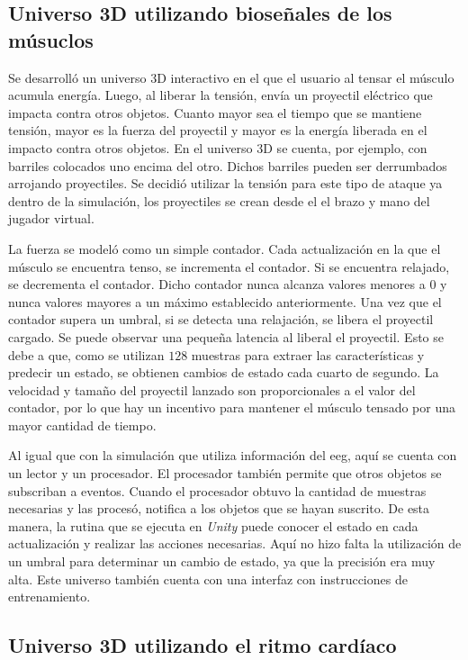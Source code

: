 \subsection{Universo 3D utilizando bioseñales de los músuclos}

Se desarrolló un universo 3D interactivo en el que el usuario al tensar el músculo acumula energía. Luego, al liberar la tensión, envía un proyectil eléctrico que impacta contra otros objetos. Cuanto mayor sea el tiempo que se mantiene tensión, mayor es la fuerza del proyectil y mayor es la energía liberada en el impacto contra otros objetos. En el universo 3D se cuenta, por ejemplo, con barriles colocados uno encima del otro. Dichos barriles pueden ser derrumbados arrojando proyectiles. Se decidió utilizar la tensión para este tipo de ataque ya dentro de la simulación, los proyectiles se crean desde el el brazo y mano del jugador virtual.

La fuerza se modeló como un simple contador. Cada actualización en la que el músculo se encuentra tenso, se incrementa el contador. Si se encuentra relajado, se decrementa el contador. Dicho contador nunca alcanza valores menores a $0$ y nunca valores mayores a un máximo establecido anteriormente. Una vez que el contador supera un umbral, si se detecta una relajación, se libera el proyectil cargado. Se puede observar una pequeña latencia al liberal el proyectil. Esto se debe a que, como se utilizan $128$ muestras para extraer las características y predecir un estado, se obtienen cambios de estado cada cuarto de segundo. La velocidad y tamaño del proyectil lanzado son proporcionales a el valor del contador, por lo que hay un incentivo para mantener el músculo tensado por una mayor cantidad de tiempo.

Al igual que con la simulación que utiliza información del \acrshort{eeg}, aquí se cuenta con un lector y un procesador. El procesador también permite que otros objetos se subscriban a eventos. Cuando el procesador obtuvo la cantidad de muestras necesarias y las procesó, notifica a los objetos que se hayan suscrito. De esta manera, la rutina que se ejecuta en \emph{Unity} puede conocer el estado en cada actualización y realizar las acciones necesarias. Aquí no hizo falta la utilización de un umbral para determinar un cambio de estado, ya que la precisión era muy alta. Este universo también cuenta con una interfaz con instrucciones de entrenamiento.

\subsection{Universo 3D utilizando el ritmo cardíaco}

